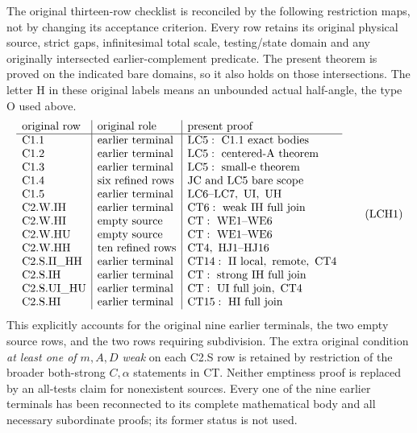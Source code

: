 The original thirteen-row checklist is reconciled by the following
restriction maps, not by changing its acceptance criterion.
Every row retains its original physical source, strict gaps,
infinitesimal total scale, testing/state domain and any originally
intersected earlier-complement predicate.
The present theorem is proved on the indicated bare domains,
so it also holds on those intersections.
The letter H in these original labels means an unbounded actual
half-angle, the type O used above.
\[
\begin{array}{l|l|l}
\text{original row}&\text{original role}&\text{present proof}\\ \hline
{\rm C1.1}&\text{earlier terminal}&{\rm LC5:\ C1.1\ exact\ bodies}\\
{\rm C1.2}&\text{earlier terminal}&{\rm LC5:\ centered\text{-}A\ theorem}\\
{\rm C1.3}&\text{earlier terminal}&{\rm LC5:\ small\text{-}e\ theorem}\\
{\rm C1.4}&\text{six refined rows}&{\rm JC\ and\ LC5\ bare\ scope}\\
{\rm C1.5}&\text{earlier terminal}&{\rm LC6\text{--}LC7,\ UI,\ UH}\\
{\rm C2.W.IH}&\text{earlier terminal}&{\rm CT6:\ weak\ IH\ full\ join}\\
{\rm C2.W.HI}&\text{empty source}&{\rm CT:\ WE1\text{--}WE6}\\
{\rm C2.W.HU}&\text{empty source}&{\rm CT:\ WE1\text{--}WE6}\\
{\rm C2.W.HH}&\text{ten refined rows}&{\rm CT4,\ HJ1\text{--}HJ16}\\
{\rm C2.S.II\_HH}&\text{earlier terminal}
                        &{\rm CT14:\ II\ local,\ remote,\ CT4}\\
{\rm C2.S.IH}&\text{earlier terminal}&{\rm CT:\ strong\ IH\ full\ join}\\
{\rm C2.S.UI\_HU}&\text{earlier terminal}
                        &{\rm CT:\ UI\ full\ join,\ CT4}\\
{\rm C2.S.HI}&\text{earlier terminal}&{\rm CT15:\ HI\ full\ join}
\end{array}\tag{LCH1}
\]
This explicitly accounts for the original nine earlier terminals,
the two empty source rows, and the two rows requiring subdivision.
The extra original condition \emph{at least one of \(m,A,D\) weak}
on each C2.S row is retained by restriction of the broader
both-strong \(C,\alpha\) statements in CT.  Neither emptiness
proof is replaced by an all-tests claim for nonexistent sources.
Every one of the nine earlier terminals has been reconnected
to its complete mathematical body and all necessary subordinate
proofs; its former status is not used.

